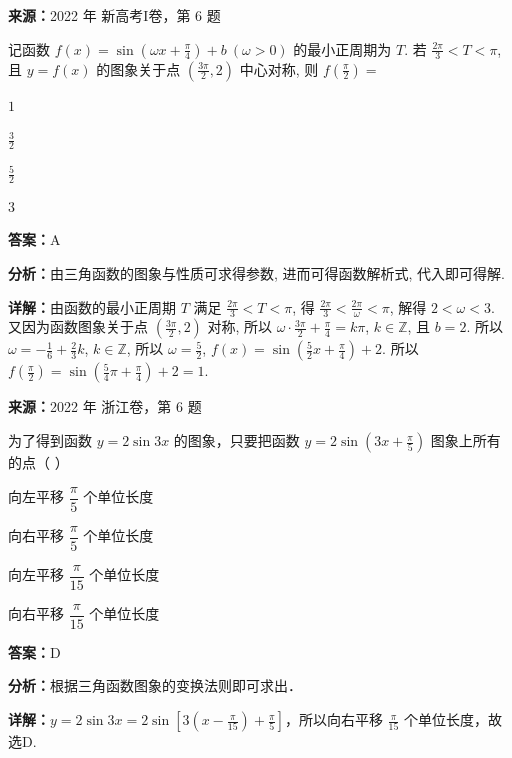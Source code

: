 \begin{question}[points=5]
\textbf{来源：}2022 年 新高考I卷，第 6 题\par
记函数 $f(x) = \sin\left(\omega x + \frac{\pi}{4}\right) + b\ (\omega > 0)$ 的最小正周期为 $T$. 若 $\frac{2\pi}{3} < T < \pi$, 且 $y = f(x)$ 的图象关于点 $\left(\frac{3\pi}{2}, 2\right)$ 中心对称, 则 $f\left(\frac{\pi}{2}\right) =$
\begin{choices}
  \item $1$
  \item $\frac{3}{2}$
  \item $\frac{5}{2}$
  \item $3$
\end{choices}
\begin{solution}
\textbf{答案：}A

\textbf{分析：}由三角函数的图象与性质可求得参数, 进而可得函数解析式, 代入即可得解.

\textbf{详解：}由函数的最小正周期 $T$ 满足 $\frac{2\pi}{3} < T < \pi$, 得 $\frac{2\pi}{3} < \frac{2\pi}{\omega} < \pi$, 解得 $2 < \omega < 3$. 又因为函数图象关于点 $\left(\frac{3\pi}{2}, 2\right)$ 对称, 所以 $\omega \cdot \frac{3\pi}{2} + \frac{\pi}{4} = k\pi$, $k \in \mathbb{Z}$, 且 $b = 2$. 所以 $\omega = -\frac{1}{6} + \frac{2}{3}k$, $k \in \mathbb{Z}$, 所以 $\omega = \frac{5}{2}$, $f(x) = \sin\left(\frac{5}{2}x + \frac{\pi}{4}\right) + 2$. 所以 $f\left(\frac{\pi}{2}\right) = \sin\left(\frac{5}{4}\pi + \frac{\pi}{4}\right) + 2 = 1$.
\end{solution}
\end{question}

\begin{question}[points=4]
\textbf{来源：}2022 年 浙江卷，第 6 题\par
为了得到函数 $y = 2\sin 3x$ 的图象，只要把函数 $y = 2\sin\left(3x + \frac{\pi}{5}\right)$ 图象上所有的点（ ）
\begin{choices}
  \item 向左平移 $\dfrac{\pi}{5}$ 个单位长度
  \item 向右平移 $\dfrac{\pi}{5}$ 个单位长度
  \item 向左平移 $\dfrac{\pi}{15}$ 个单位长度
  \item 向右平移 $\dfrac{\pi}{15}$ 个单位长度
\end{choices}
\begin{solution}
\textbf{答案：}D

\textbf{分析：}根据三角函数图象的变换法则即可求出．

\textbf{详解：}$y = 2\sin 3x = 2\sin\left[3\left(x - \frac{\pi}{15}\right) + \frac{\pi}{5}\right]$，所以向右平移 $\frac{\pi}{15}$ 个单位长度，故选D.
\end{solution}
\end{question}


